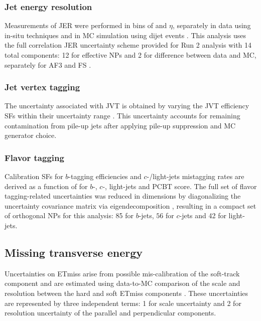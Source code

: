 \documentclass[../thesis.tex]{subfiles}
\begin{document}
\subsubsection*{Jet energy resolution}
Measurements of \acs{JER} were performed in bins of \pT and $\eta$, separately in data using in-situ techniques and in \acs{MC} simulation using dijet events \citep{reco:jet_jer}. This analysis uses the full correlation \acs{JER} uncertainty scheme provided for Run 2 analysis with 14 total components: 12 for effective \acs{NP}s and 2 for difference between data and \acs{MC}, separately for \acs{AF3} and \acs{FS} \citep{reco:jet_jer}.

\subsubsection*{Jet vertex tagging}
The uncertainty associated with \acs{JVT} is obtained by varying the \acs{JVT} efficiency \acs{SF}s within their uncertainty range \citep{syst:jvt_calib}. This uncertainty accounts for remaining contamination from pile-up jets after applying pile-up suppression and \acs{MC} generator choice.

\subsubsection*{Flavor tagging}
Calibration \acs{SF}s for $b$-tagging efficiencies and $c$-/light-jets mistagging rates are derived as a function of \pT for $b$-, $c$-, light-jets and \acs{PCBT} score. The full set of flavor tagging-related uncertainties was reduced in dimensions by diagonalizing the uncertainty covariance matrix via eigendecomposition \citep{ftag:calib}, resulting in a compact set of orthogonal \acs{NP}s for this analysis: 85 for $b$-jets, $56$ for $c$-jets and 42 for light-jets.

\subsection{Missing transverse energy}
Uncertainties on \acs{ETmiss} arise from possible mis-calibration of the soft-track component and are estimated using data-to-\acs{MC} comparison of the \pT scale and resolution between the hard and soft \acs{ETmiss} components \citep{reco:met}. These uncertainties are represented by three independent terms: 1 for scale uncertainty and 2 for resolution uncertainty of the parallel and perpendicular components.

\end{document}

